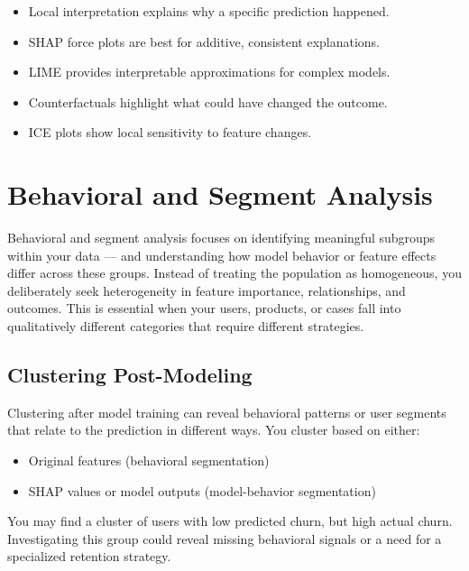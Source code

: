 \documentclass[12pt,openany]{book}
\begin{document}
\begin{summarybox}
\begin{itemize}
  \item Local interpretation explains why a specific prediction happened.
  \item SHAP force plots are best for additive, consistent explanations.
  \item LIME provides interpretable approximations for complex models.
  \item Counterfactuals highlight what could have changed the outcome.
  \item ICE plots show local sensitivity to feature changes.
\end{itemize}
\end{summarybox}




\chapter{Behavioral and Segment Analysis}

Behavioral and segment analysis focuses on identifying meaningful subgroups within your data — and understanding how model behavior or feature effects differ across these groups. Instead of treating the population as homogeneous, you deliberately seek heterogeneity in feature importance, relationships, and outcomes. This is essential when your users, products, or cases fall into qualitatively different categories that require different strategies.

\section{Clustering Post-Modeling}

Clustering after model training can reveal behavioral patterns or user segments that relate to the prediction in different ways. You cluster based on either:
\begin{itemize}
  \item Original features (behavioral segmentation)
  \item SHAP values or model outputs (model-behavior segmentation)
\end{itemize}

\begin{examplebox}
You may find a cluster of users with low predicted churn, but high actual churn. Investigating this group could reveal missing behavioral signals or a need for a specialized retention strategy.
\end{examplebox}
\end{document}
